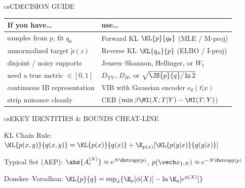 \documentclass[../../../../master.tex]{subfiles}
\begin{document}
\begin{cscolumns}
\begin{cscard}{csC}{DECISION GUIDE}
  \renewcommand{\arraystretch}{1.18}\small
  \begin{tabular}{@{}>{\raggedright\arraybackslash}p{3.2cm}>{\raggedright\arraybackslash}p{4.7cm}@{}}
    \textbf{If you have\ldots} & \textbf{use\ldots}\\ \hline
    samples from $p$, fit $q_\theta$ & Forward KL $\KL{p}{q_\theta}$ (MLE / M-proj)\\
    unnormalized target $\tilde p(z)$ & Reverse KL $\KL{q_\phi}{p}$ (ELBO / I-proj)\\
    disjoint / noisy supports & Jensen--Shannon, Hellinger, or $W_1$\\
    need a true metric $\in[0,1]$ & $D_{\mathrm{TV}}$, $D_H$, or $\sqrt{\JS{p}{q}/\ln 2}$\\
    continuous IB representation & VIB with Gaussian encoder $e_\theta(t|x)$\\
    strip nuisance cleanly & CEB ($\min \beta\MI(X;T|Y)-\MI(T;Y)$)\\
  \end{tabular}
\end{cscard}

\begin{cscard}{csE}{KEY IDENTITIES \& BOUNDS CHEAT-LINE}
  \begin{csbul}
    \item KL Chain Rule: $\KL{p(x,y)}{q(x,y)}=\KL{p(x)}{q(x)}+\E_{p(x)}[\KL{p(y|x)}{q(y|x)}]$
    \item Typical Set (AEP): $\abs{A_\epsilon^{(N)}}\approx e^{N\Entropy(p)}$, $p(\vecb x_{1:N})\approx e^{-N\Entropy(p)}$
    \item Donsker--Varadhan: $\KL{p}{q}=\sup_\phi\{\E_p[\phi(X)]-\ln\E_q[e^{\phi(X)}]\}$
  \end{csbul}
\end{cscard}


\end{cscolumns}
\end{document}
